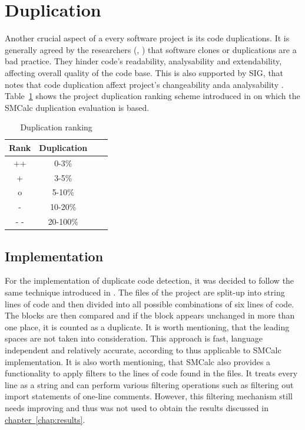 \documentclass[11pt]{report}
\newcommand{\lnautoref}[1]{\hyperref[#1]{chapter~\ref{#1}}}
\begin{document}
\section{Duplication}
\label{sec:duplication}

Another crucial aspect of a every software project is its code duplications. It is generally agreed by the researchers (\cite{Kapser2006}, \cite{Koschke2008Ch2}) that software clones or duplications are a bad practice. They hinder code's readability, analysability and extendability, affecting overall quality of the code base. This is also supported by SIG, that notes that code duplication affext project's changeability anda analysability \cite{Heitlager2007}. Table~\ref{tab:duplication-ranking} shows the project duplication ranking scheme introduced in \cite{Heitlager2007} on which the SMCalc duplication evaluation is based.

\begin{table}[H]
    \centering
    \begin{tabular}{|c|c|c|c|}
        \hline
        \textbf{Rank} & \textbf{Duplication} \\ \hline
        ++ & 0-3\%\\ \hline
        + & 3-5\% \\ \hline
        o & 5-10\% \\ \hline
        - & 10-20\% \\ \hline
        - - & 20-100\% \\ \hline
    \end{tabular}
    \caption{Duplication ranking}
    \label{tab:duplication-ranking}
\end{table}

\subsection{Implementation}
\label{subsec:duplication-implementation}

For the implementation of duplicate code detection, it was decided to follow the same technique introduced in \cite{Heitlager2007}. The files of the project are split-up into string lines of code and then divided into all possible combinations of six lines of code. The blocks are then compared and if the block appears unchanged in more than one place, it is counted as a duplicate. It is worth mentioning, that the leading spaces are not taken into consideration. This approach is fast, language independent and relatively accurate, according to \cite{Heitlager2007} thus applicable to SMCalc implementation. It is also worth mentioning, that SMCalc also provides a functionality to apply filters to the lines of code found in the files. It treats every line as a string and can perform various filtering operations such as filtering out import statements of one-line comments. However, this filtering mechanism still needs improving and thus was not used to obtain the results discussed in \lnautoref{chap:results}.
\end{document}
